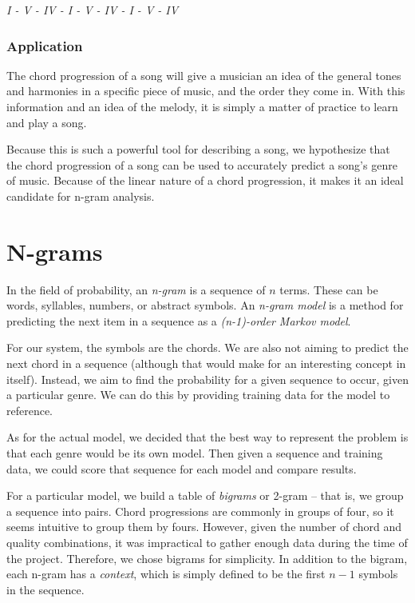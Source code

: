 \documentclass{article}
\begin{document}
		\begin{center}
		\emph{I - V - IV - I - V - IV - I - V - IV}
		\end{center}

		\subsubsection{Application}
		The chord progression of a song will give a musician an idea of the general 
		tones and harmonies in a specific piece of music, and the order they 
		come in.  With this information and an idea of the melody, it is simply 
		a matter of practice to learn and play a song.

		Because this is such a powerful tool for describing a song, we hypothesize 
		that the chord progression of a song can be used to accurately predict a 
		song's genre of music.  Because of the linear nature of a chord progression, 
		it makes it an ideal candidate for n-gram analysis.
  
\newpage

\section{N-grams}

In the field of probability, an \emph{n-gram} is a sequence of $n$ terms. These can be
words, syllables, numbers, or abstract symbols. An \emph{n-gram model} is a method
for predicting the next item in a sequence as a \emph{(n-1)-order Markov model}. 

For our system, the symbols are the chords. We are also not aiming to predict the
next chord in a sequence (although that would make for an interesting concept in
itself). Instead, we aim to find the probability for a given sequence to occur, given
a particular genre. We can do this by providing training data for the model to reference.

As for the actual model, we decided that the best way to represent the problem is
that each genre would be its own model. Then given a sequence and training data,
we could score that sequence for each model and compare results. 

For a particular model, we build a table of \emph{bigrams} or 2-gram -- that is, we group
a sequence into pairs. Chord progressions are commonly in groups of four, so it 
seems intuitive to group them by fours. However,
given the number of chord and quality combinations, it was impractical to gather
enough data during the time of the project. Therefore, we chose bigrams for
simplicity. In addition to the bigram, each n-gram has a \emph{context}, which
is simply defined to be the first $n-1$ symbols in the sequence.
\end{document}
